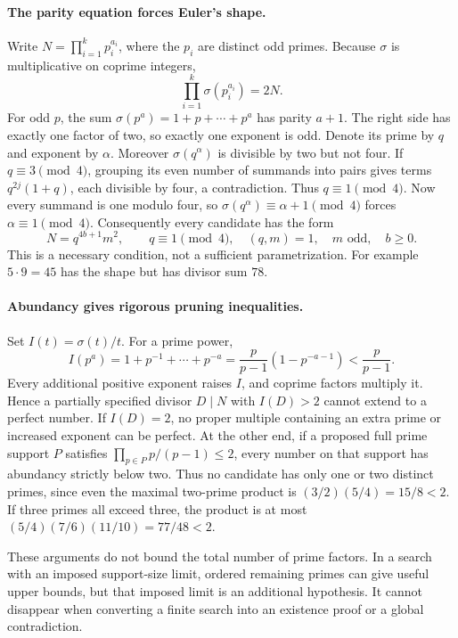 \documentclass[11pt]{article}
\begin{document}
\paragraph{The parity equation forces Euler's shape.}
Write $N=\prod_{i=1}^k p_i^{a_i}$, where the $p_i$ are distinct odd primes.
Because $\sigma$ is multiplicative on coprime integers,
\[
 \prod_{i=1}^k\sigma(p_i^{a_i})=2N.
\]
For odd $p$, the sum $\sigma(p^a)=1+p+\cdots+p^a$ has parity $a+1$.
The right side has exactly one factor of two, so exactly one exponent
is odd. Denote its prime by $q$ and exponent by $\alpha$.
Moreover $\sigma(q^\alpha)$ is divisible by two but not four.
If $q\equiv3\pmod4$, grouping its even number of summands into pairs
gives terms $q^{2j}(1+q)$, each divisible by four, a contradiction.
Thus $q\equiv1\pmod4$. Now every summand is one modulo four, so
$\sigma(q^\alpha)\equiv\alpha+1\pmod4$ forces $\alpha\equiv1\pmod4$.
Consequently every candidate has the form
\[
 N=q^{4b+1}m^2,\qquad q\equiv1\pmod4,\quad (q,m)=1,
 \quad m\text{ odd},\quad b\ge0.
\]
This is a necessary condition, not a sufficient parametrization.
For example $5\cdot9=45$ has the shape but has divisor sum $78$.

\paragraph{Abundancy gives rigorous pruning inequalities.}
Set $I(t)=\sigma(t)/t$. For a prime power,
\[
 I(p^a)=1+p^{-1}+\cdots+p^{-a}
       =\frac{p}{p-1}(1-p^{-a-1})<\frac p{p-1}.
\]
Every additional positive exponent raises $I$, and coprime factors
multiply it. Hence a partially specified divisor $D\mid N$ with
$I(D)>2$ cannot extend to a perfect number. If $I(D)=2$, no proper
multiple containing an extra prime or increased exponent can be perfect.
At the other end, if a proposed full prime support $P$ satisfies
$\prod_{p\in P}p/(p-1)\le2$, every number on that support has
abundancy strictly below two. Thus no candidate has only one or two
distinct primes, since even the maximal two-prime product is
$(3/2)(5/4)=15/8<2$. If three primes all exceed three, the product is
at most $(5/4)(7/6)(11/10)=77/48<2$.

These arguments do not bound the total number of prime factors. In a
search with an imposed support-size limit, ordered remaining primes can
give useful upper bounds, but that imposed limit is an additional
hypothesis. It cannot disappear when converting a finite search into an
existence proof or a global contradiction.
\end{document}
